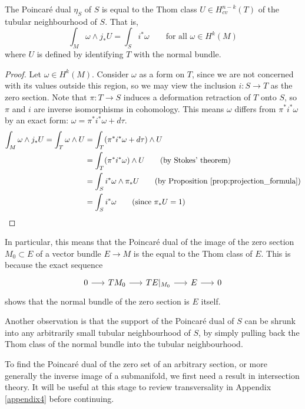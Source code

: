 \begin{thm} \label{thm:poincare_thom} %
	The Poincar\'e dual $\eta_S$ of $S$ is equal to the Thom class 
	$U\in H^{n-k}_{cv}(T)$ of the
	tubular neighbourhood of $S$. That is, 
	\[
		\int_M \omega\wedge j_*U = \int_S i^*\omega \qquad
		\text{for all } \omega\in H^k(M)
	\] 
	where $U$ is defined by identifying 
	$T$ with the normal bundle.
\end{thm}
\begin{proof}
	Let $\omega \in H^k(M)$. Consider $\omega$ as a form on  $T$, since
	we are not concerned with its values outside this region, so we may view
	the inclusion $i : S \to T$ as the zero section. Note that $\pi : T \to S$
	induces a deformation retraction of $T$ onto $S$, so $\pi$ and  $i$
	are inverse isomorphisms in cohomology. This means $\omega$ differs from
	$\pi^*i^*\omega$ by an exact form:  $\omega = \pi^*i^*\omega + d\tau$.
	\begin{align*}
		\int_M \omega\wedge j_*U 
		= \int_T \omega \wedge U 
		&= \int_T (\pi^*i^*\omega + d\tau) \wedge U \\
		&= \int_T (\pi^*i^*\omega) \wedge U \tag{by Stokes' theorem}\\
		&= \int_S i^*\omega  \wedge \pi_*U 
		\tag{by Proposition \ref{prop:projection_formula}}\\
		&= \int_S i^*\omega \tag{since $\pi_*U = 1$} 
	\end{align*}
\end{proof}
\vspace{-1.5ex}
In particular, this means that the Poincar\'e dual of the image of the zero 
section $M_0\subset E$ of a vector bundle $E\to M$ is the equal to the Thom 
class of  $E$. This is because the exact sequence 
\[
	\begin{tikzcd}[column sep = 1.6em]
		0 \arrow[r] & TM_0 \arrow[r] & TE|_{M_0} \arrow[r] 
						& E \arrow[r] & 0
	\end{tikzcd}
	\]
shows that the normal bundle of the zero section is  $E$ itself.  

\begin{remark}
	Another observation is that the support of the Poincar\'e dual of $S$ can be
	shrunk into any arbitrarily small tubular neighbourhood of $S$, 
	by simply pulling back the Thom class of the
	normal bundle into the tubular neighbourhood.
\end{remark}

To find the Poincar\'e dual of the zero set of an arbitrary section, or more
generally the inverse image of a submanifold, we first need a result 
in intersection theory.
It will be useful at this stage to review transversality in Appendix
\ref{appendix4} before continuing. 

